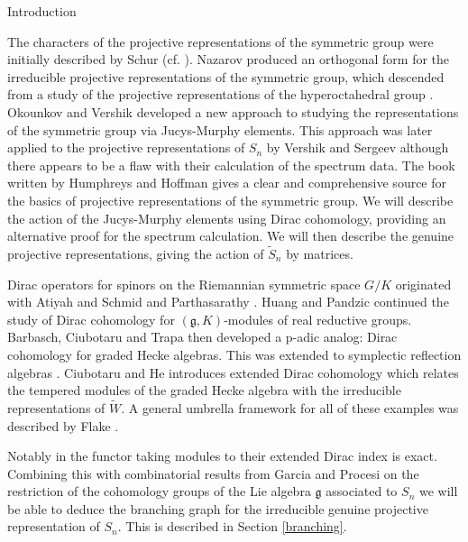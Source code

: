 \documentclass[a4paper,10pt]{amsart}
\begin{document}
\begin{section}{Introduction} 





The characters of the projective representations of the symmetric group were initially described by Schur (cf. \cite{S89}). Nazarov \cite{N90} produced an orthogonal form for the irreducible projective representations of the symmetric group, which descended from a study of the projective representations of the hyperoctahedral group \cite{N97}. Okounkov and Vershik \cite{OV96} developed a new approach to studying the representations of the symmetric group via Jucys-Murphy elements. This approach was later applied to the projective representations of $S_n$ by Vershik and Sergeev \cite{VS08} although there appears to be a flaw with their calculation of the spectrum data. The book written by Humphreys and Hoffman \cite{HH92} gives a clear and comprehensive source for the basics of projective representations of the symmetric group. We will describe the action of the Jucys-Murphy elements using Dirac cohomology, providing an alternative proof for the spectrum calculation. We will then describe the genuine projective representations, giving the action of $\tilde{S}_n$ by matrices.
 
 



Dirac operators for spinors on the Riemannian symmetric space $G/K$ originated with Atiyah and Schmid \cite{AS77} and Parthasarathy \cite{P72}. Huang and Pandzic \cite{HP02} continued the study of Dirac cohomology for $(\mathfrak{g},K)$-modules of real reductive groups. Barbasch, Ciubotaru and Trapa \cite{BCT12} then developed a p-adic analog: Dirac cohomology for graded Hecke algebras. This was extended to symplectic reflection algebras \cite{C16}. Ciubotaru and He \cite{CH15}  introduces extended Dirac cohomology which relates the tempered modules of the graded Hecke algebra with the irreducible representations of $\tilde{W}$. A general umbrella framework for all of these examples was described by Flake \cite{F16}. 

Notably in \cite{CH15} the functor taking modules to their extended Dirac index is exact. Combining this with combinatorial results from Garcia and Procesi \cite{GP92} on the restriction of the cohomology groups of the Lie algebra $\mathfrak{g}$ associated to $S_n$ we will be able to deduce the branching graph for the irreducible genuine projective representation of $S_n$. This is described in Section \ref{branching}.


\end{section}
\end{document}
